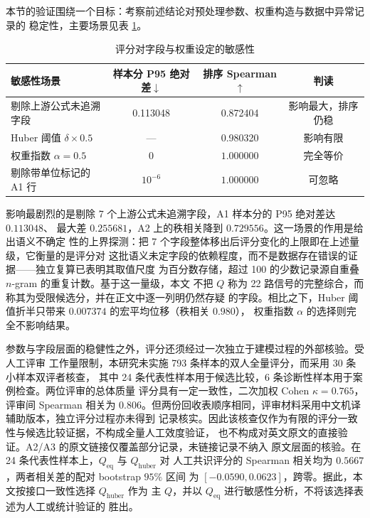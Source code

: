 \documentclass[bwprint]{gmcmthesis}
\numberwithin{equation}{section}
\numberwithin{figure}{section}
\numberwithin{table}{section}
\begin{document}
本节的验证围绕一个目标：考察前述结论对预处理参数、权重构造与数据中异常记录的
稳定性，主要场景见表 \ref{tab:q1-sens}。

\begin{table}[htp!]
\centering
\renewcommand\arraystretch{1.2}
\caption{评分对字段与权重设定的敏感性}\label{tab:q1-sens}
\begin{tabular*}{\textwidth}{@{\extracolsep{\fill}}lccc@{}}
\toprule
敏感性场景 & 样本分 P95 绝对差$\downarrow$ & 排序 Spearman$\uparrow$ & 判读 \\
\midrule
剔除上游公式未追溯字段 & 0.113048 & 0.872404 & 影响最大，排序仍稳 \\
Huber 阈值 $\delta\times0.5$ & --- & 0.980320 & 影响有限 \\
权重指数 $\alpha=0.5$ & $0$ & $1.000000$ & 完全等价 \\
剔除带单位标记的 A1 行 & $10^{-6}$ & $1.000000$ & 可忽略 \\
\bottomrule
\end{tabular*}
\end{table}

影响最剧烈的是剔除 7 个上游公式未追溯字段，A1 样本分的 P95 绝对差达 $0.113048$、
最大差 $0.255681$，A2 上的秩相关降到 $0.729556$。这一场景的作用是给出语义不确定
性的上界探测：把 7 个字段整体移出后评分变化的上限即在上述量级，它衡量的是评分对
这批语义未定字段的依赖程度，而不是数据存在错误的证据——独立复算已表明其取值尺度
为百分数存储，超过 100 的少数记录源自重叠 $n$-gram 的重复计数。基于这一量级，本文
不把 $Q$ 称为 22 路信号的完整综合，而称其为受限候选分，并在正文中逐一列明仍然存疑
的字段。相比之下，Huber 阈值折半只带来 $0.007374$ 的宏平均位移（秩相关 $0.980$），
权重指数 $\alpha$ 的选择则完全不影响结果。

参数与字段层面的稳健性之外，评分还须经过一次独立于建模过程的外部核验。受人工评审
工作量限制，本研究未实施 793 条样本的双人全量评分，而采用 30 条小样本双评者核查，
其中 24 条代表性样本用于候选比较，6 条诊断性样本用于案例检查。两位评审的总体质量
评分具有一定一致性，二次加权 Cohen $\kappa=0.765$，评审间 Spearman 相关为
$0.806$。但两份回收表顺序相同，评审材料采用中文机译辅助版本，独立评分过程亦未得到
记录核实。因此该核查仅作为有限的评分一致性与候选比较证据，不构成全量人工效度验证，
也不构成对英文原文的直接验证。A2/A3 的原文链接仅覆盖部分记录，未链接记录不纳入
原文层面的核验。在 24 条代表性样本上，$Q_{\mathrm{eq}}$ 与 $Q_{\mathrm{huber}}$ 对
人工共识评分的 Spearman 相关均为 $0.5667$，两者相关差的配对 bootstrap $95\%$ 区间
为 $[-0.0590,0.0623]$，跨零。据此，本文按接口一致性选择 $Q_{\mathrm{huber}}$ 作为
主 $Q$，并以 $Q_{\mathrm{eq}}$ 进行敏感性分析，不将该选择表述为人工或统计验证的
胜出。
\end{document}
